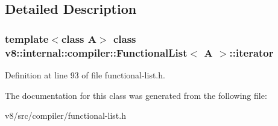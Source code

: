 \subsection{Detailed Description}
\subsubsection*{template$<$class A$>$\newline
class v8\+::internal\+::compiler\+::\+Functional\+List$<$ A $>$\+::iterator}



Definition at line 93 of file functional-\/list.\+h.



The documentation for this class was generated from the following file\+:\begin{DoxyCompactItemize}
\item 
v8/src/compiler/functional-\/list.\+h\end{DoxyCompactItemize}
